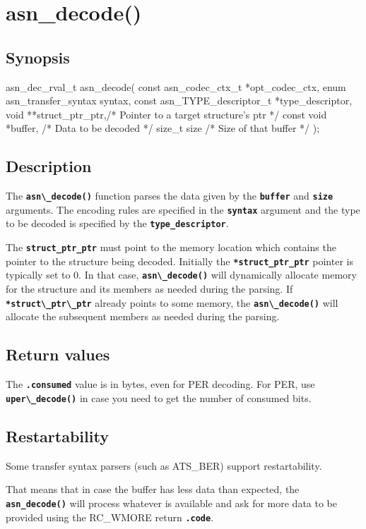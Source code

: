 \documentclass[english,oneside,12pt]{book}
\newcommand{\apisection}[2]{\clearpage\section{\label{#1}#2}}
\newcommand{\code}[1]{\texttt{\textbf{\lstinline{#1}}}}
\begin{document}
\apisection{sec:asn_decode}{asn\_decode()}

\subsection*{Synopsis}
\begin{signature}
asn_dec_rval_t asn_decode(
    const asn_codec_ctx_t *opt_codec_ctx,
    enum asn_transfer_syntax syntax,
    const asn_TYPE_descriptor_t *type_descriptor,
    void **struct_ptr_ptr,/* Pointer to a target structure's ptr */
    const void *buffer,   /* Data to be decoded */
    size_t size           /* Size of that buffer */
);
\end{signature}

\subsection*{Description}

The \code{asn\_decode()} function parses the data given by the \code{buffer}
and \code{size} arguments. The encoding rules are specified in the \code{syntax}
argument and the type to be decoded is specified by the \code{type_descriptor}.

The \code{struct_ptr_ptr} must point to the memory location which contains the
pointer to the structure being decoded. Initially the \code{*struct_ptr_ptr}
pointer is typically set to 0. In that case, \code{asn\_decode()} will
dynamically allocate memory for the structure and its members as needed
during the parsing.
If \code{*struct\_ptr\_ptr} already points to some memory, the \code{asn\_decode()}
will allocate the subsequent members as needed during the parsing.

\subsection*{Return values}



The \code{.consumed} value is in bytes, even for PER decoding.
For PER, use \code{uper\_decode()} in case you need to get
the number of consumed bits.

\subsection*{Restartability}

Some transfer syntax parsers (such as ATS\_BER) support restartability.

That means that in case the buffer has less data than expected,
the \code{asn_decode()} will process whatever is available and ask for more
data to be provided using the RC\_WMORE return \code{.code}.
\end{document}
